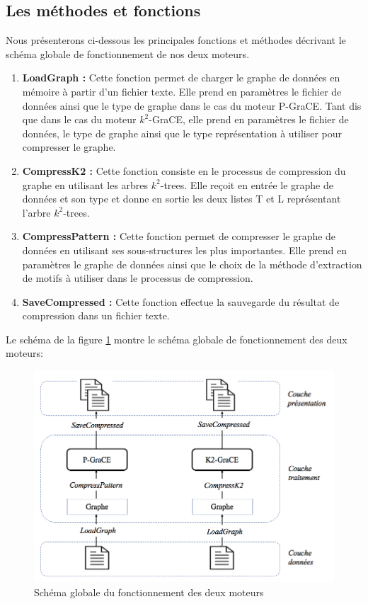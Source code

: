 \subsection{Les méthodes et fonctions }
	Nous présenterons ci-dessous les principales fonctions et méthodes décrivant le schéma globale de fonctionnement de nos deux moteurs.
	
	\begin{enumerate}[label=(\alph*)]
		\item \textbf{LoadGraph :} Cette fonction permet de charger le graphe de données en mémoire à partir d'un fichier texte. Elle prend en paramètres le fichier de données ainsi que le type de graphe dans le cas du moteur P-GraCE. Tant dis que dans le cas du moteur $k^2$-GraCE, elle prend en paramètres le fichier de données, le type de graphe ainsi que le type représentation à utiliser pour compresser le graphe.
		\item \textbf{CompressK2 :} Cette fonction consiste en le processus de compression du graphe en utilisant les arbres $k^2$-trees. Elle reçoit en entrée le graphe de données et son type et donne en sortie les deux listes T et L représentant l'arbre $k^2$-trees.
		
		\item \textbf{CompressPattern :} Cette fonction permet de compresser le graphe de données en utilisant ses sous-structures les plus importantes. Elle prend en paramètres le graphe de données ainsi que le choix de la méthode d'extraction de motifs à utiliser dans le processus de compression.
		
		\item \textbf{SaveCompressed :}  Cette fonction effectue la sauvegarde du résultat de compression dans un fichier texte.
		
	\end{enumerate}	
	
	Le schéma de la figure \ref{Img:functMethod} montre le schéma globale de fonctionnement des deux moteurs:  
	
	\begin{figure}[H]
	
	\label{Img:functMethod}
	\includegraphics[scale=0.5]{ressources/image/funct.png}
	\centering
	\caption{Schéma globale du fonctionnement des deux moteurs}
 \end{figure}
	
